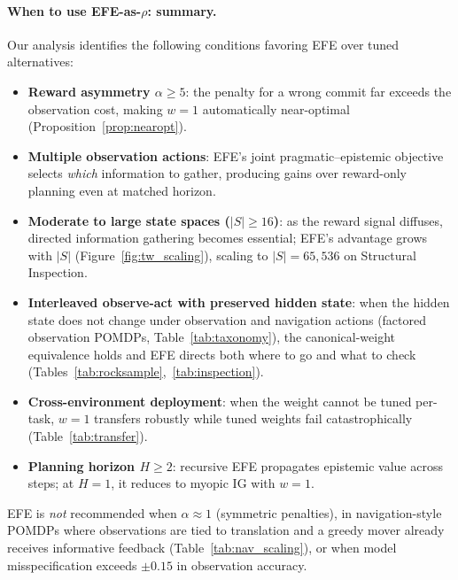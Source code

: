 \documentclass[runningheads]{llncs}
\begin{document}
\paragraph{When to use EFE-as-$\rho$: summary.}
Our analysis identifies the following conditions favoring EFE over tuned alternatives:
\begin{itemize}[leftmargin=1.5em,itemsep=1pt,topsep=2pt]
\item \textbf{Reward asymmetry $\alpha \geq 5$}: the penalty for a wrong commit far exceeds the observation cost, making $w{=}1$ automatically near-optimal (Proposition~\ref{prop:nearopt}).
\item \textbf{Multiple observation actions}: EFE's joint pragmatic--epistemic objective selects \emph{which} information to gather, producing gains over reward-only planning even at matched horizon.
\item \textbf{Moderate to large state spaces ($|S| \geq 16$)}: as the reward signal diffuses, directed information gathering becomes essential; EFE's advantage grows with $|S|$ (Figure~\ref{fig:tw_scaling}), scaling to $|S|{=}65{,}536$ on Structural Inspection.
\item \textbf{Interleaved observe-act with preserved hidden state}: when the hidden state does not change under observation and navigation actions (factored observation POMDPs, Table~\ref{tab:taxonomy}), the canonical-weight equivalence holds and EFE directs both where to go and what to check (Tables~\ref{tab:rocksample},~\ref{tab:inspection}).
\item \textbf{Cross-environment deployment}: when the weight cannot be tuned per-task, $w{=}1$ transfers robustly while tuned weights fail catastrophically (Table~\ref{tab:transfer}).
\item \textbf{Planning horizon $H \geq 2$}: recursive EFE propagates epistemic value across steps; at $H{=}1$, it reduces to myopic IG with $w{=}1$.
\end{itemize}
EFE is \emph{not} recommended when $\alpha \approx 1$ (symmetric penalties), in navigation-style POMDPs where observations are tied to translation and a greedy mover already receives informative feedback (Table~\ref{tab:nav_scaling}), or when model misspecification exceeds $\pm 0.15$ in observation accuracy.
\end{document}
